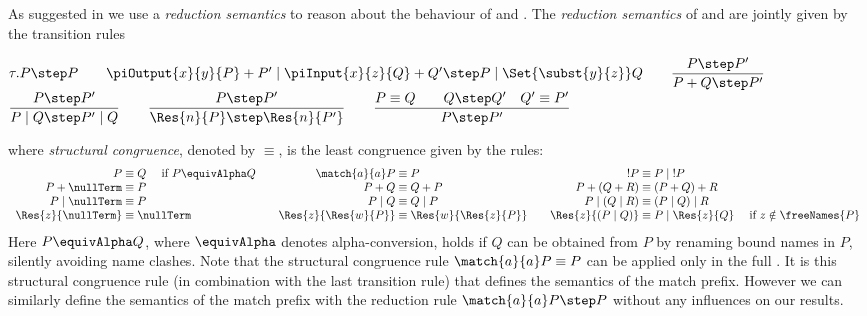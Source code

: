 \documentclass[final,copyright,creativecommons]{eptcs}
\begin{document}
As suggested in \cite{gorla} we use a \emph{reduction semantics} to reason about the behaviour of \piT and \piNM.
The \emph{reduction semantics} of \piT and \piNM are jointly given by the transition rules\vspace{0.75em}
\begin{center}
	$ \tau.P \step P \hspace*{2em} \piOutput{x}{y}{P} + P' \mid \piInput{x}{z}{Q} + Q' \step P \mid \Set{ \subst{y}{z} }Q \hspace*{2em} \dfrac{P \step P'}{P + Q \step P'} $\vspace{0.75em}\\
	$ \dfrac{P \step P'}{P \mid Q \step P' \mid Q} \hspace*{2em} \dfrac{P \step P'}{\Res{n}{P} \step \Res{n}{P'}} \hspace*{2em} \dfrac{P \equiv Q \quad \quad Q \step Q' \quad Q' \equiv P'}{P \step P'} $\vspace{0.75em}
\end{center}
where \emph{structural congruence}, denoted by $ \equiv $, is the least congruence given by the rules:\vspace{0.75em}
\begin{align*}
	\begin{array}{r@{\;}c@{\;}l@{\hspace{2em}}r@{\;}c@{\;}l@{\hspace{2em}}r@{\;}c@{\;}l}
		P & \equiv & Q \quad \text{ if } P \equivAlpha Q & \match{a}{a}P & \equiv & P & !P & \equiv & P \mid \; !P\\
		P + \nullTerm & \equiv & P & P + Q & \equiv & Q + P & P + \left( Q + R \right) & \equiv & \left( P + Q \right) + R\\
		P \mid \nullTerm & \equiv & P & P \mid Q & \equiv & Q \mid P & P \mid \left( Q \mid R \right) & \equiv & \left( P \mid Q \right) \mid R\\
		\Res{z}{\nullTerm} & \equiv & \nullTerm & \Res{z}{\Res{w}{P}} & \equiv & \Res{w}{\Res{z}{P}} & \Res{z}{\left( P \mid Q \right)} & \equiv & P \mid \Res{z}{Q} \quad \text{ if } z \notin \freeNames{P}
	\end{array}
\end{align*}
Here $ P \equivAlpha Q $, where $ \equivAlpha $ denotes alpha-conversion, holds if $ Q $ can be obtained from $ P $ by renaming bound names in $ P $, silently avoiding name clashes.
Note that the structural congruence rule $ \match{a}{a}P \equiv P $ can be applied only in the full \piCal. It is this structural congruence rule (in combination with the last transition rule) that defines the semantics of the match prefix. However we can similarly define the semantics of the match prefix with the reduction rule $ \match{a}{a}P \step P $ without any influences on our results.
\end{document}
